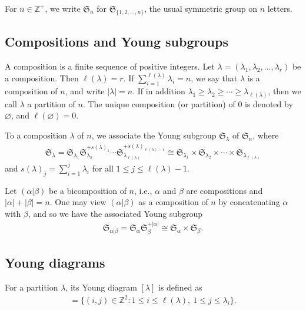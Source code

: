 \documentclass[pdftex]{sigma}
\newcommand{\sym}[1]{\mathfrak{S}_{#1}}
\newcommand{\tlsym}[2]{\mathfrak{S}_{#1}^{+#2}}
\begin{document}
For $n \in \mathbb{Z}^+$, we write $\sym{n}$ for $\sym{\{1,2,\dotsc, n\}}$, the usual symmetric group on $n$ letters.

\subsection{Compositions and Young subgroups}

A composition is a finite sequence of positive integers. Let $\lambda = (\lambda_1,\lambda_2,\dotsc, \lambda_r)$ be a composition. Then $\ell(\lambda) = r$. If $\sum\limits_{i=1}^{\ell(\lambda)} \lambda_i = n$, we say that $\lambda$ is a composition of $n$, and write $|\lambda| = n$. If in addition $\lambda_1 \geq \lambda_2 \geq \dotsb \geq \lambda_{\ell(\lambda)}$, then we call $\lambda$ a partition of $n$. The unique composition (or partition) of 0 is denoted by $\varnothing$, and $\ell(\varnothing)=0$.

To a composition $\lambda$ of $n$, we associate the Young subgroup $\sym{\lambda}$ of $\sym{n}$, where{\samepage
\begin{gather*}
\sym{\lambda} = \sym{\lambda_1} \tlsym{\lambda_2}{s(\lambda)_1} \dotsm \tlsym{\lambda_{\ell(\lambda)}}{s(\lambda)_{\ell(\lambda)-1}} \cong \sym{\lambda_1} \times \sym{\lambda_2} \times \dotsb \times \sym{\lambda_{\ell(\lambda)}}
\end{gather*}
and $s(\lambda)_j = \sum\limits_{i=1}^j \lambda_i$ for all $1 \leq j \leq \ell(\lambda)-1$.}

Let $(\alpha|\beta)$ be a bicomposition of $n$, i.e., $\alpha$ and $\beta$ are compositions and $|\alpha| + |\beta| = n$. One may view $(\alpha|\beta)$ as a composition of $n$ by concatenating $\alpha$ with $\beta$, and so we have the associated Young subgroup
\begin{gather*}
\sym{\alpha|\beta} = \sym{\alpha} \tlsym{\beta}{|\alpha|} \cong \sym{\alpha} \times \sym{\beta}.\end{gather*}

\subsection{Young diagrams}

For a partition $\lambda$, its Young diagram $[\lambda]$ is defined as
\begin{gather*}
[\lambda] = \big\{ (i,j) \in \mathbb{Z}^2 \colon 1\leq i \leq \ell(\lambda),\ 1 \leq j \leq \lambda_i \big\}.
\end{gather*}
\end{document}
